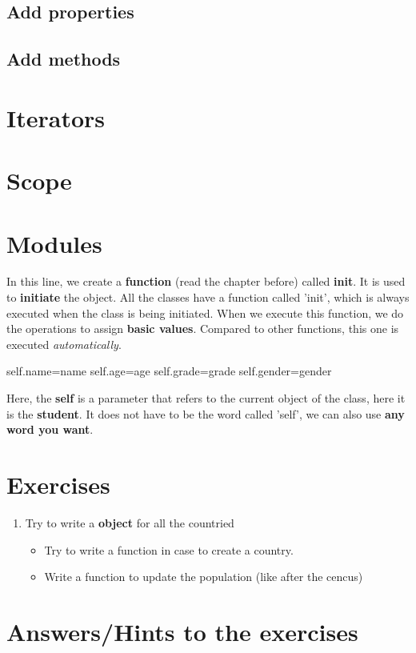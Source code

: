 \documentclass[12pt]{article}
\begin{document}
\subsection{Add properties}
\subsection{Add methods}
\section{Iterators}
\section{Scope}
\section{Modules}

\par In this line, we create a \textbf{function} (read the chapter before) called \textbf{init}. It is used to \textbf{initiate} the object. All the classes have a function called 'init', which is always executed when the class is being initiated. When we execute this function, we do the operations to assign \textbf{basic values}. Compared to other functions, this one is executed \textit{automatically}.
\begin{python}
  self.name=name	
	self.age=age
	self.grade=grade
	self.gender=gender
\end{python}
\par Here, the \textbf{self} is a parameter that refers to the current object of the class, here it is the \textbf{student}. It does not have to be the word called 'self', we can also use \textbf{any word you want}.
\section{Exercises}
\begin{enumerate}
	\item Try to write a \textbf{object} for all the countried
		\begin{itemize}
			\item Try to write a function in case to create a country.
			\item Write a function to update the population (like after the cencus)
		\end{itemize}
\end{enumerate}
\newpage
\section{Answers/Hints to the exercises}
\newpage
\printbibliography
\end{document}

